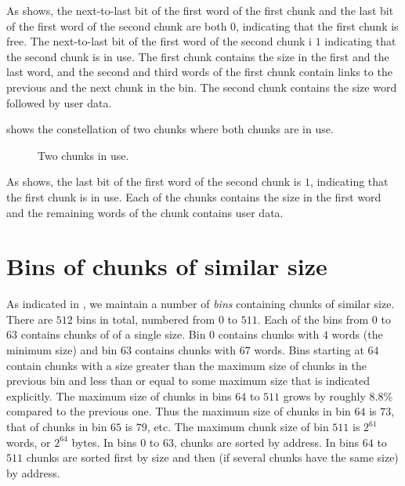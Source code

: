 As  shows, the next-to-last bit of the first word
of the first chunk and the last bit of the first word of the second
chunk are both $0$, indicating that the first chunk is free.  The
next-to-last bit of the first word of the second chunk i $1$
indicating that the second chunk is in use.  The first chunk contains
the size in the first and the last word, and the second and third
words of the first chunk contain links to the previous and the next
chunk in the bin.  The second chunk contains the size word followed by
user data.

 shows the constellation of two chunks where both
chunks are in use.

\begin{figure}
\begin{center}
\end{center}
\caption{\label{fig-chunks4}
Two chunks in use.}
\end{figure}

As  shows, the last bit of the first word of the
second chunk is $1$, indicating that the first chunk is in use.  Each
of the chunks contains the size in the first word and the remaining
words of the chunk contains user data.

\section{Bins of chunks of similar size}
\label{sec-memory-allocator-bins-of-chunks}

As indicated in
, we maintain
a number of \emph{bins} containing chunks of similar size.  There are
$512$ bins in total, numbered from $0$ to $511$.  Each of the bins
from $0$ to $63$ contains chunks of of a single size.  Bin $0$
contains chunks with $4$ words (the minimum size) and bin $63$
contains chunks with $67$ words.  Bins starting at $64$ contain chunks
with a size greater than the maximum size of chunks in the previous
bin and less than or equal to some maximum size that is indicated
explicitly.  The maximum size of chunks in bins $64$ to $511$ grows by
roughly $8.8$\% compared to the previous one.  Thus the maximum size
of chunks in bin $64$ is $73$, that of chunks in bin $65$ is $79$,
etc.  The maximum chunk size of bin $511$ is $2^{61}$ words, or
$2^{64}$ bytes.  In bins $0$ to $63$, chunks are sorted by address.  In
bins $64$ to $511$ chunks are sorted first by size and then (if
several chunks have the same size) by address.

